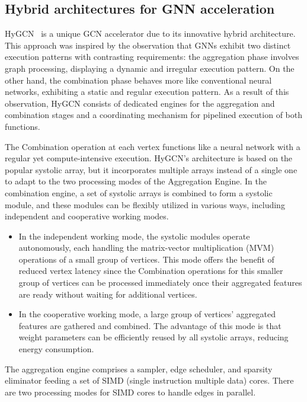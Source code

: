 \subsection{Hybrid architectures for GNN acceleration}
\label{subsec:hybrid-architectures}

HyGCN~\cite{DBLP:journals/corr/abs-2001-02514} is a unique GCN accelerator due to its innovative hybrid architecture.
This approach was inspired by the observation that GNNs exhibit two distinct execution patterns with contrasting requirements: the aggregation phase involves graph processing, displaying a dynamic and irregular execution pattern.
On the other hand, the combination phase behaves more like conventional neural networks, exhibiting a static and regular execution pattern.
As a result of this observation, HyGCN consists of dedicated engines for the aggregation and combination stages and a coordinating mechanism for pipelined execution of both functions.

The Combination operation at each vertex functions like a neural network with a regular yet compute-intensive execution.
HyGCN's architecture is based on the popular systolic array, but it incorporates multiple arrays instead of a single one to adapt to the two processing modes of the Aggregation Engine.
In the combination engine, a set of systolic arrays is combined to form a systolic module, and these modules can be flexibly utilized in various ways, including independent and cooperative working modes.

\begin{itemize}
    \item In the independent working mode, the systolic modules operate autonomously, each handling the matrix-vector multiplication (MVM) operations of a small group of vertices.
          This mode offers the benefit of reduced vertex latency since the Combination operations for this smaller group of vertices can be processed immediately once their aggregated features are ready without waiting for additional vertices.
    \item In the cooperative working mode, a large group of vertices' aggregated features are gathered and combined.
          The advantage of this mode is that weight parameters can be efficiently reused by all systolic arrays, reducing energy consumption.
\end{itemize}

The aggregation engine comprises a sampler, edge scheduler, and sparsity eliminator feeding a set of SIMD (single instruction multiple data) cores.
There are two processing modes for SIMD cores to handle edges in parallel.

